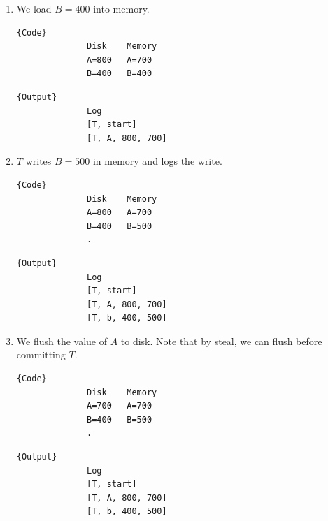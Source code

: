 \begin{example}
\begin{enumerate}
        \item We load $B=400$ into memory. 

          \noindent\begin{minipage}{.46\textwidth}
            \begin{lstlisting}[]{Code}
              Disk    Memory
              A=800   A=700
              B=400   B=400
            \end{lstlisting}
            \end{minipage}
            \hfill
            \begin{minipage}{.45\textwidth}
            \begin{lstlisting}[]{Output}
              Log 
              [T, start]
              [T, A, 800, 700]
            \end{lstlisting}
          \end{minipage}

        \item $T$ writes $B=500$ in memory and logs the write. 

          \noindent\begin{minipage}{.46\textwidth}
            \begin{lstlisting}[]{Code}
              Disk    Memory
              A=800   A=700
              B=400   B=500
              .
            \end{lstlisting}
            \end{minipage}
            \hfill
            \begin{minipage}{.45\textwidth}
            \begin{lstlisting}[]{Output}
              Log 
              [T, start]
              [T, A, 800, 700]
              [T, b, 400, 500]
            \end{lstlisting}
          \end{minipage}

        \item We flush the value of $A$ to disk. Note that by steal, we can flush before committing $T$.  

          \noindent\begin{minipage}{.46\textwidth}
            \begin{lstlisting}[]{Code}
              Disk    Memory
              A=700   A=700
              B=400   B=500
              .
            \end{lstlisting}
            \end{minipage}
            \hfill
            \begin{minipage}{.45\textwidth}
            \begin{lstlisting}[]{Output}
              Log 
              [T, start]
              [T, A, 800, 700]
              [T, b, 400, 500]
            \end{lstlisting}
          \end{minipage} 


\end{enumerate}
\end{example}
